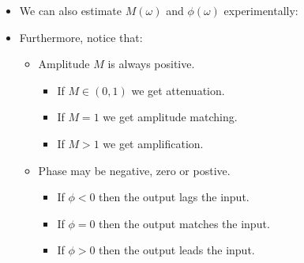 \documentclass[ 10pt, xcolor = dvipsnames]{beamer}
\begin{document}
\begin{frame}[allowframebreaks]
\begin{itemize}
\end{itemize}
\framebreak

\begin{itemize}
\item We can also estimate $M(\omega)$ and $\phi(\omega)$ experimentally: 
\halfskip
\begin{figure}[htb]
\centering
\def\svgwidth{0.8\columnwidth}

\end{figure}
\end{itemize}
\framebreak

\begin{itemize}
\item Furthermore, notice that: 
\begin{itemize}
\item Amplitude $M$ is always positive. 
\begin{itemize}
\item If $M \in (0,1)$ we get attenuation. 
\item If $M = 1$ we get amplitude matching. 
\item If $M > 1$ we get amplification. 
\end{itemize}
\item Phase may be negative, zero or postive. 
\begin{itemize}
\item If $\phi < 0$ then the output lags the input. 
\item If $\phi = 0$ then the output matches the input. 
\item If $\phi > 0$ then the output leads the input. 
\end{itemize}
\end{itemize}
\end{itemize}

\end{frame}
\end{document}
